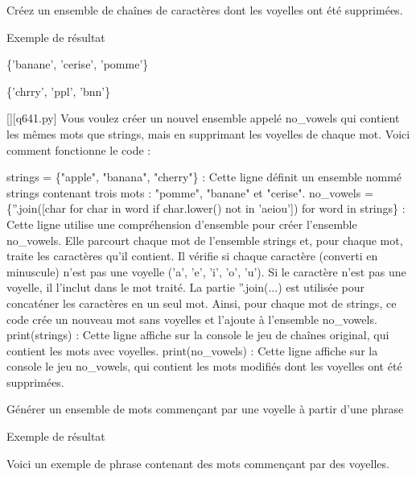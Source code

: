         \question
        Créez un ensemble de chaînes de caractères dont les voyelles ont été supprimées.

Exemple de résultat

\{'banane', 'cerise', 'pomme'\}

\{'chrry', 'ppl', 'bnn'\}
        \par
        \begin{solution}
            \renewcommand{\nomfichier}{q641.py}
            \pythonfile{\chemincode \nomfichier}[][\nomfichier]
            Vous voulez créer un nouvel ensemble appelé no\_vowels qui contient les mêmes mots que strings, mais en supprimant les voyelles de chaque mot. Voici comment fonctionne le code :

    strings = \{"apple", "banana", "cherry"\} : Cette ligne définit un ensemble nommé strings contenant trois mots : "pomme", "banane" et "cerise".
    no\_vowels = \{''.join([char for char in word if char.lower() not in 'aeiou']) for word in strings\} : Cette ligne utilise une compréhension d'ensemble pour créer l'ensemble no\_vowels. Elle parcourt chaque mot de l'ensemble strings et, pour chaque mot, traite les caractères qu'il contient. Il vérifie si chaque caractère (converti en minuscule) n'est pas une voyelle ('a', 'e', 'i', 'o', 'u'). Si le caractère n'est pas une voyelle, il l'inclut dans le mot traité. La partie ''.join(...) est utilisée pour concaténer les caractères en un seul mot. Ainsi, pour chaque mot de strings, ce code crée un nouveau mot sans voyelles et l'ajoute à l'ensemble no\_vowels.
    print(strings) : Cette ligne affiche sur la console le jeu de chaînes original, qui contient les mots avec voyelles.
    print(no\_vowels) : Cette ligne affiche sur la console le jeu no\_vowels, qui contient les mots modifiés dont les voyelles ont été supprimées.
        \end{solution}
        

        \question
        Générer un ensemble de mots commençant par une voyelle à partir d'une phrase

Exemple de résultat

Voici un exemple de phrase contenant des mots commençant par des voyelles.

